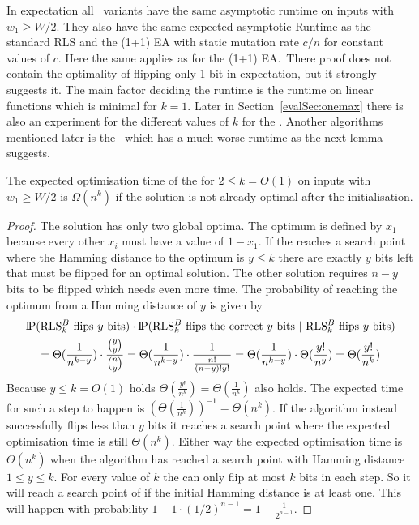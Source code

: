 In expectation all \RLSR~variants have the same asymptotic runtime on inputs with $w_1\ge W/2$.
They also have the same expected asymptotic Runtime as the standard RLS and the (1+1) EA with static mutation rate $c/n$ for constant values of $c$.
Here the same applies as for the (1+1) EA.\
There proof does not contain the optimality of flipping only 1 bit in expectation, but it strongly suggests it.
The main factor deciding the runtime is the runtime on linear functions which is minimal for $k=1$.
Later in Section~\ref{evalSec:onemax} there is also an experiment for the different values of $k$ for the \RLSR[k].
Another algorithms mentioned later is the \RLSN~which has a much worse runtime as the next lemma suggests.

\begin{lemma}\label{lemma:RLSNBad}
    The expected optimisation time of the \RLSN[k] for $2\le k=O(1)$ on inputs with $w_1\ge W/2$ is $\Omega(n^k)$ if the solution is not already optimal after the initialisation.
\end{lemma}
\begin{proof}
    The solution has only two global optima.
    The optimum is defined by $x_1$ because every other $x_i$ must have a value of $1-x_1$.
    If the \RLSN[k] reaches a search point where the Hamming distance to the optimum is $y\le k$ there are exactly $y$ bits left that must be flipped for an optimal solution.
    The other solution requires $n-y$ bits to be flipped which needs even more time.
    The probability of reaching the optimum from a Hamming distance of $y$ is given by
    \begin{gather}\nonumber
        \probP(\text{\RLSN[k] flips $y$ bits})\cdot\probP(\text{\RLSN[k] flips the correct $y$ bits | \RLSN[k] flips $y$ bits})\\ \nonumber
        =  \Theta(\frac{1}{n^{k-y}}) \cdot \frac{\binom{y}{y}}{\binom{n}{y}}
        =  \Theta(\frac{1}{n^{k-y}}) \cdot \frac{1}{\frac{n!}{(n-y)!y!}}
        =  \Theta(\frac{1}{n^{k-y}}) \cdot \Theta(\frac{y!}{n^y})
        =  \Theta(\frac{y!}{n^{k}})
    \end{gather}
    Because $y\le k = O(1)$ holds $\Theta(\frac{y!}{n^{k}})=\Theta(\frac{1}{n^{k}})$ also holds.
    The expected time for such a step to happen is ${(\Theta(\frac{1}{n^{k}}))}^{-1}=\Theta(n^{k})$.
    If the algorithm instead successfully flips less than $y$ bits it reaches a search point where the expected optimisation time is still $\Theta(n^{k})$.
    Either way the expected optimisation time is $\Theta(n^{k})$ when the algorithm has reached a search point with Hamming distance $1\le y\le k$.
    For every value of $k$ the \RLSN[k] can only flip at most $k$ bits in each step.
    So it will reach a search point of \RLSN[k] if the initial Hamming distance is at least one.
    This will happen with probability $1-1\cdot{(1/2)}^{n-1}=1-\frac{1}{2^{n-1}}$.
\end{proof}

